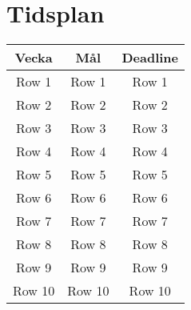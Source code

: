 \section{Tidsplan}

\begin{center}
  \begin{tabular}{|c|c|c|}
    \hline
    \textbf{Vecka} & \textbf{Mål} & \textbf{Deadline} \\
    \hline
    Row 1 & Row 1 & Row 1 \\
    \hline
    Row 2 & Row 2 & Row 2 \\
    \hline
    Row 3 & Row 3 & Row 3 \\
    \hline
    Row 4 & Row 4 & Row 4 \\
    \hline
    Row 5 & Row 5 & Row 5 \\
    \hline
    Row 6 & Row 6 & Row 6 \\
    \hline
    Row 7 & Row 7 & Row 7 \\
    \hline
    Row 8 & Row 8 & Row 8 \\
    \hline
    Row 9 & Row 9 & Row 9 \\
    \hline
    Row 10 & Row 10 & Row 10 \\
    \hline
  \end{tabular}
\end{center}